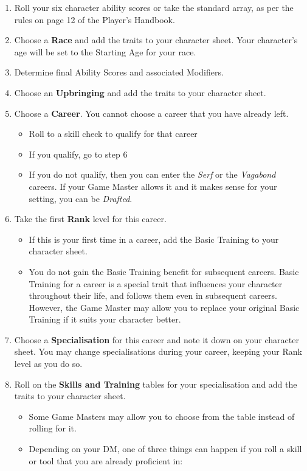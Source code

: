 \documentclass[10pt,twoside]{article}
\begin{document}
\begin{multicols}{2}
\begin{enumerate}
\item Roll your six character ability scores or take the standard array, as per the rules on page 12 of the Player’s Handbook.
\item Choose a \textbf{Race} and add the traits to your character sheet. Your character’s age will be set to the Starting Age for your race.
\item Determine final Ability Scores and associated Modifiers.
\item Choose an \textbf{Upbringing} and add the traits to your character sheet.
\item Choose a \textbf{Career}. You cannot choose a career that you have already left.
\begin{itemize}
\item Roll to a skill check to qualify for that career
\item If you qualify, go to step 6
\item If you do not qualify, then you can enter the \textit{Serf} or the \textit{Vagabond} careers. If your Game Master allows it and it makes sense for your setting, you can be \textit{Drafted}.
\end{itemize}
\item Take the first \textbf{Rank} level for this career.
\begin{itemize}
\item If this is your first time in a career, add the Basic Training to your character sheet.
\item You do not gain the Basic Training benefit for subsequent careers. Basic Training for a career is a special trait that influences your character throughout their life, and follows them even in subsequent careers. However, the Game Master may allow you to replace your original Basic Training if it suits your character better.
\end{itemize}
\item Choose a \textbf{Specialisation} for this career and note it down on your character sheet. You may change specialisations during your career, keeping your Rank level as you do so.
\item Roll on the \textbf{Skills and Training} tables for your specialisation and add the traits to your character sheet.
\begin{itemize}
\item Some Game Masters may allow you to choose from the table instead of rolling for it.
\item Depending on your DM, one of three things can happen if you roll a skill or tool that you are already proficient in:

\end{itemize}
\end{enumerate}
\end{multicols}
\end{document}
